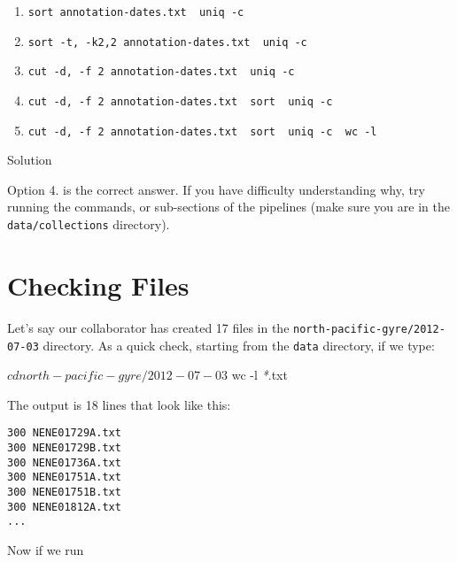 \documentclass[
]{book}
\newenvironment{Shaded}{\begin{snugshade}}{\end{snugshade}}
\newcommand{\AttributeTok}[1]{\textcolor[rgb]{0.13,0.29,0.53}{#1}}
\newcommand{\ExtensionTok}[1]{#1}
\newcommand{\FunctionTok}[1]{\textcolor[rgb]{0.13,0.29,0.53}{\textbf{#1}}}
\newcommand{\KeywordTok}[1]{\textcolor[rgb]{0.13,0.29,0.53}{\textbf{#1}}}
\newcommand{\NormalTok}[1]{#1}
\newcommand{\PreprocessorTok}[1]{\textcolor[rgb]{0.56,0.35,0.01}{\textit{#1}}}
\providecommand{\tightlist}{%
  \setlength{\itemsep}{0pt}\setlength{\parskip}{0pt}}
\begin{document}
\begin{enumerate}
\def\labelenumi{\arabic{enumi}.}
\tightlist
\item
  \texttt{sort\ annotation-dates.txt\ \textbar{}\ uniq\ -c}
\item
  \texttt{sort\ -t,\ -k2,2\ annotation-dates.txt\ \textbar{}\ uniq\ -c}
\item
  \texttt{cut\ -d,\ -f\ 2\ annotation-dates.txt\ \textbar{}\ uniq\ -c}
\item
  \texttt{cut\ -d,\ -f\ 2\ annotation-dates.txt\ \textbar{}\ sort\ \textbar{}\ uniq\ -c}
\item
  \texttt{cut\ -d,\ -f\ 2\ annotation-dates.txt\ \textbar{}\ sort\ \textbar{}\ uniq\ -c\ \textbar{}\ wc\ -l}
\end{enumerate}

Solution

Option 4. is the correct answer. If you have difficulty understanding why, try running the commands, or sub-sections of the pipelines (make sure you are in the \texttt{data/collections} directory).

\section{Checking Files}\label{checking-files}

Let's say our collaborator has created 17 files in the \texttt{north-pacific-gyre/2012-07-03} directory. As a quick check, starting from the \texttt{data} directory, if we type:

\begin{Shaded}
\begin{Highlighting}[]
\ExtensionTok{$}\NormalTok{ cd north{-}pacific{-}gyre/2012{-}07{-}03}
\ExtensionTok{$}\NormalTok{ wc }\AttributeTok{{-}l} \PreprocessorTok{*}\NormalTok{.txt}
\end{Highlighting}
\end{Shaded}

The output is 18 lines that look like this:

\begin{verbatim}
300 NENE01729A.txt
300 NENE01729B.txt
300 NENE01736A.txt
300 NENE01751A.txt
300 NENE01751B.txt
300 NENE01812A.txt
...
\end{verbatim}

Now if we run

\begin{Shaded}
\end{Shaded}
\end{document}
